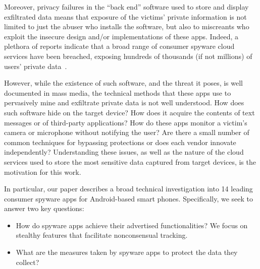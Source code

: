 Moreover, privacy failures in the ``back end'' software used to store and
display exfiltrated data means that exposure of the victims' private information is not limited to just the abuser who installs the software, but also to miscreants who exploit the insecure design and/or implementations of these apps.
Indeed, a plethora of reports indicate that a broad range of consumer spyware cloud services have been breached,
exposing hundreds of thousands (if not millions) of users' private data~\cite{HackerSt66:online,Companyt8:online,mSpybrea38:online,mSpyCybe86:online,Cerberus12:online,Stalkerw59:online,HackerSt50:online,Spywaref13:online,RetinaXa98:online,Hackercl62:online}.

However, while the existence of such software, and the threat it poses,
is well documented in mass media, the technical methods that these apps use to pervasively mine and exfiltrate private data is not well understood.
How does such software hide on
the target device?  How does it acquire the contents of text messages
or of third-party applications? How do these apps monitor a victim's camera or microphone without notifying the user?  Are there a small number of
common techniques for bypassing protections or does each vendor
innovate independently?  Understanding these issues, as well as the
nature of the cloud services used to store the most sensitive data
captured from target devices, is the motivation for this work.

In particular, our paper describes a broad technical investigation
into 14 leading consumer spyware apps for Android-based smart
phones.
Specifically, we seek to answer two key questions:
\begin{itemize}
    \item How do spyware apps achieve their advertised functionalities? We focus on stealthy features that facilitate nonconsensual tracking.
    \item What are the measures taken by spyware apps to protect the data they collect?
\end{itemize}


